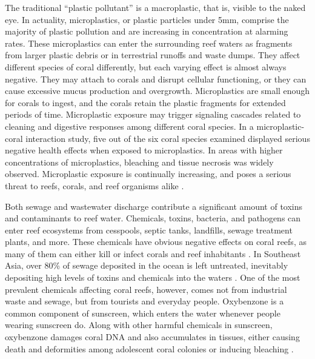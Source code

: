 \documentclass{book}\usepackage{knitr}
\begin{document}
\begin{knitrout}
\begin{kframe}
The traditional ``plastic pollutant'' is a macroplastic, that is, visible to the naked eye. In actuality, microplastics, or plastic particles under 5mm, comprise the majority of plastic pollution and are increasing in concentration at alarming rates. These microplastics can enter the surrounding reef waters as fragments from larger plastic debris or in terrestrial runoffs and waste dumps. They affect different species of coral differently, but each varying effect is almost always negative. They may attach to corals and disrupt cellular functioning, or they can cause excessive mucus production and overgrowth. Microplastics are small enough for corals to ingest, and the corals retain the plastic fragments for extended periods of time. Microplastic exposure may trigger signaling cascades related to cleaning and digestive responses among different coral species. In a microplastic-coral interaction study, five out of the six coral species examined displayed serious negative health effects when exposed to microplastics. In areas with higher concentrations of microplastics, bleaching and tissue necrosis was widely observed. Microplastic exposure is continually increasing, and poses a serious threat to reefs, corals, and reef organisms alike \citep{12907334620180601}.

Both sewage and wastewater discharge contribute a significant amount of toxins and contaminants to reef water. Chemicals, toxins, bacteria, and pathogens can enter reef ecosystems from cesspools, septic tanks, landfills, sewage treatment plants, and more. These chemicals have obvious negative effects on coral reefs, as many of them can either kill or infect corals and reef inhabitants \citep{coralreefalliance_2021}. In Southeast Asia, over 80\% of sewage deposited in the ocean is left untreated, inevitably depositing high levels of toxins and chemicals into the waters \citep{4884777420100401}. One of the most prevalent chemicals affecting coral reefs, however, comes not from industrial waste and sewage, but from tourists and everyday people. Oxybenzone is a common component of sunscreen, which enters the water whenever people wearing sunscreen do. Along with other harmful chemicals in sunscreen, oxybenzone damages coral DNA and also accumulates in tissues, either causing death and deformities among adolescent coral colonies or inducing bleaching \citep{USEPA_2017}.


\end{kframe}
\end{knitrout}
\end{document}
